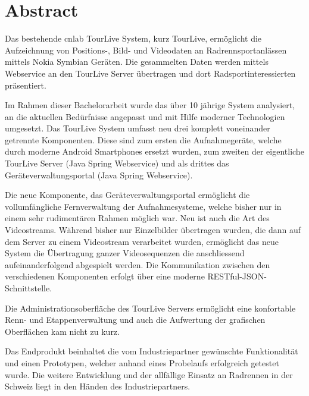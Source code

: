 \chapter*{Abstract}
Das bestehende cnlab TourLive System, kurz TourLive, ermöglicht die Aufzeichnung von Positions-, Bild- und Videodaten an Radrennsportanlässen mittels Nokia Symbian Geräten. Die gesammelten Daten werden mittels Webservice an den TourLive Server übertragen und dort Radsportinteressierten präsentiert.



Im Rahmen dieser Bachelorarbeit wurde das über 10 jährige System analysiert, an die aktuellen Bedürfnisse angepasst und mit Hilfe moderner Technologien umgesetzt. Das TourLive System umfasst neu drei komplett voneinander getrennte Komponenten. Diese sind zum ersten die Aufnahmegeräte, welche durch moderne Android Smartphones ersetzt wurden, zum zweiten der eigentliche TourLive Server (Java Spring Webservice) und als drittes das Geräteverwaltungsportal (Java Spring Webservice). 


Die neue Komponente, das Geräteverwaltungsportal ermöglicht die vollumfängliche Fernverwaltung der Aufnahmesysteme, welche bisher nur in einem sehr rudimentären Rahmen möglich war. Neu ist auch die Art des Videostreams. Während bisher nur Einzelbilder übertragen wurden, die dann auf dem Server zu einem Videostream verarbeitet wurden, ermöglicht das neue System die Übertragung ganzer Videosequenzen die anschliessend aufeinanderfolgend abgespielt werden. Die Kommunikation zwischen den verschiedenen Komponenten erfolgt über eine moderne RESTful-JSON-Schnittstelle. 


Die Administrationsoberfläche des TourLive Servers ermöglicht eine konfortable Renn- und Etappenverwaltung und auch die  Aufwertung der grafischen Oberflächen kam nicht zu kurz. 


Das Endprodukt beinhaltet die vom Industriepartner gewünschte Funktionalität und einen Prototypen, welcher anhand eines Probelaufs erfolgreich getestet wurde. Die weitere Entwicklung und der allfällige Einsatz an Radrennen in der Schweiz liegt in den Händen des Industriepartners.